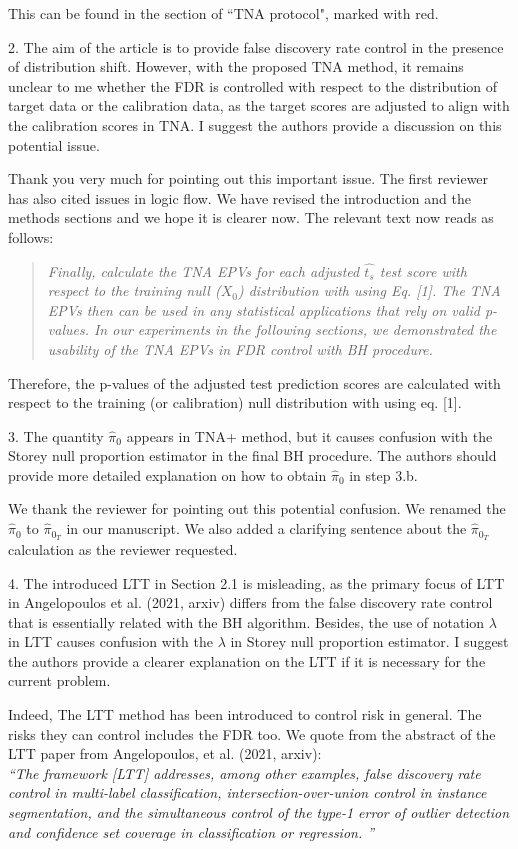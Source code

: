 \documentclass{article}
\newcommand{\response}[1]{\vspace*{1ex} \color{blue} \noindent #1 \color{black}
\vspace*{2ex}}
\newcommand{\edit}[1]{\begin{quotation}\color{red}\noindent #1
\color{black}\end{quotation}}
\begin{document}
\response{This can be found in the section of ``TNA protocol", marked with red. }

2. The aim of the article is to provide false discovery rate control in the presence of distribution shift.
However, with the proposed TNA method, it remains unclear to me whether the FDR is controlled with respect to the distribution of target data or the calibration data, as the target scores are adjusted to align with the calibration scores in TNA.
I suggest the authors provide a discussion on this potential issue.

\response{Thank you very much for pointing out this important issue. The first reviewer has also cited issues in logic flow. We have revised the introduction and the methods sections and we hope it is clearer now. The relevant text now reads as follows:}

\edit{\em Finally, calculate the TNA EPVs for each adjusted $\hat{t_s}$ test score with respect to the training null ($X_0$) distribution with using Eq. [1]. The TNA EPVs then can be used in any statistical applications that rely on valid p-values. In our experiments in the following sections, we demonstrated the usability of the TNA EPVs in FDR control with BH procedure.}

\response{Therefore, the p-values of the adjusted test prediction scores are calculated with respect to the training (or calibration) null distribution with using eq. [1].}

3. The quantity $\hat{\pi}_0$ appears in TNA+ method, but it causes confusion with the Storey null proportion estimator in the final BH procedure.
The authors should provide more detailed explanation on how to obtain $\hat{\pi}_0$ in step 3.b.

\response{We thank the reviewer for pointing out this potential confusion. We renamed the  $\hat{\pi}_0$ to $\hat{\pi}_{0_{T}}$ in our manuscript. We also added a clarifying sentence about the $\hat{\pi}_{0_{T}}$ calculation as the reviewer requested.}


4. The introduced LTT in Section 2.1 is misleading, as the primary focus of LTT in Angelopoulos et al. (2021, arxiv) differs from the false discovery rate control that is essentially related with the BH algorithm.
Besides, the use of notation $\lambda$ in LTT causes confusion with the $\lambda$ in Storey null proportion estimator.
I suggest the authors provide a clearer explanation on the LTT if it is necessary for the current problem.

\response{Indeed, The LTT method has been introduced to control risk in general. The risks they can control includes the FDR too. We quote from the abstract of the LTT paper from Angelopoulos, et al. (2021, arxiv):\\
{\em ``The framework [LTT] addresses, among other examples, false discovery rate control in multi-label classification, intersection-over-union control in instance segmentation, and the simultaneous control of the type-1 error of outlier detection and confidence set coverage in classification or regression. ''}}
\end{document}
